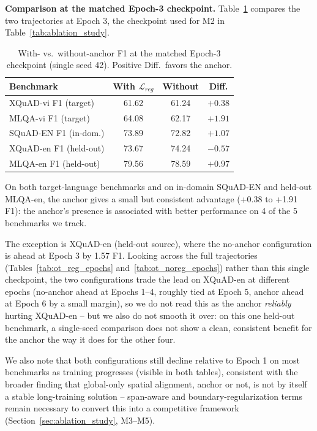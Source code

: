 \documentclass[11pt]{article}
\begin{document}
\textbf{Comparison at the matched Epoch-3 checkpoint.} Table~\ref{tab:reg_ablation_summary} compares the two trajectories at Epoch 3, the checkpoint used for M2 in Table~\ref{tab:ablation_study}.

\begin{table}[t]
\centering
\small
\begin{tabular}{lccc}
\toprule
Benchmark & With $\mathcal{L}_{reg}$ & Without & Diff. \\
\midrule
XQuAD-vi F1 (target) & 61.62 & 61.24 & $+0.38$ \\
MLQA-vi F1 (target) & 64.08 & 62.17 & $+1.91$ \\
SQuAD-EN F1 (in-dom.) & 73.89 & 72.82 & $+1.07$ \\
XQuAD-en F1 (held-out) & 73.67 & 74.24 & $-0.57$ \\
MLQA-en F1 (held-out) & 79.56 & 78.59 & $+0.97$ \\
\bottomrule
\end{tabular}
\caption{With- vs.\ without-anchor F1 at the matched Epoch-3 checkpoint (single seed 42). Positive Diff.\ favors the anchor.}
\label{tab:reg_ablation_summary}
\end{table}

On both target-language benchmarks and on in-domain SQuAD-EN and held-out MLQA-en, the anchor gives a small but consistent advantage (+0.38 to +1.91 F1): the anchor's presence is associated with better performance on 4 of the 5 benchmarks we track.

The exception is XQuAD-en (held-out source), where the no-anchor configuration is ahead at Epoch 3 by 1.57 F1. Looking across the full trajectories (Tables~\ref{tab:ot_reg_epochs} and~\ref{tab:ot_noreg_epochs}) rather than this single checkpoint, the two configurations trade the lead on XQuAD-en at different epochs (no-anchor ahead at Epochs 1--4, roughly tied at Epoch 5, anchor ahead at Epoch 6 by a small margin), so we do not read this as the anchor \emph{reliably} hurting XQuAD-en -- but we also do not smooth it over: on this one held-out benchmark, a single-seed comparison does not show a clean, consistent benefit for the anchor the way it does for the other four.

We also note that both configurations still decline relative to Epoch 1 on most benchmarks as training progresses (visible in both tables), consistent with the broader finding that global-only spatial alignment, anchor or not, is not by itself a stable long-training solution -- span-aware and boundary-regularization terms remain necessary to convert this into a competitive framework (Section~\ref{sec:ablation_study}, M3--M5).
\end{document}
